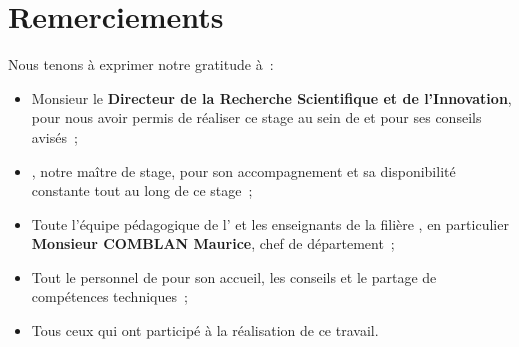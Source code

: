 \chapter*{Remerciements}

Nous tenons \`a exprimer notre gratitude \`a~:

\begin{itemize}
  \item Monsieur le \textbf{Directeur de la Recherche Scientifique et de l'Innovation}, pour nous avoir permis de r\'ealiser ce stage au sein de \entreprise{} et pour ses conseils avis\'es~;
  \item \textbf{\maitredestage}, notre ma\^itre de stage, pour son accompagnement et sa disponibilit\'e constante tout au long de ce stage~;
  \item Toute l'\'equipe p\'edagogique de l'\ecole{} et les enseignants de la fili\`ere \filiere, en particulier \textbf{Monsieur COMBLAN Maurice}, chef de d\'epartement~;
  \item Tout le personnel de \entreprise{} pour son accueil, les conseils et le partage de comp\'etences techniques~;
  \item Tous ceux qui ont particip\'e \`a la r\'ealisation de ce travail.
\end{itemize}